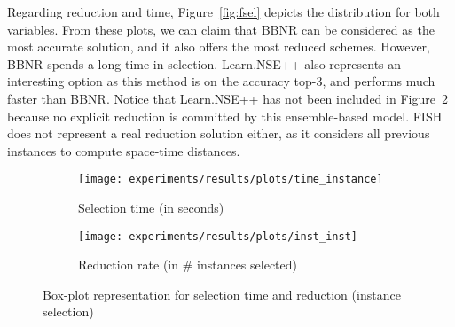 \documentclass[preprint,12pt]{elsarticle}
\begin{document}
\begin{table}[!htp]
\renewcommand{\arraystretch}{1.3}
\centering
\scriptsize
\caption{Wilcoxon test results and average rankings of methods (Friedman Procedure \& Adjusted p-value with Holm's Test) for accuracy}
\label{tab:wilcoxon-isel}
\end{table}

Regarding reduction and time, Figure~\ref{fig:fsel} depicts the distribution for both variables. From these plots, we can claim that BBNR can be considered as the most accurate solution, and it also offers the most reduced schemes. However, BBNR spends a long time in selection. Learn.NSE++ also represents an interesting option as this method is on the accuracy top-3, and performs much faster than BBNR. Notice that Learn.NSE++ has not been included in Figure~\ref{fig:inst-isel} because no explicit reduction is committed by this ensemble-based model. FISH does not represent a real reduction solution either, as it considers all previous instances to compute space-time distances.

\begin{figure}
\begin{subfigure}{.5\textwidth}
  \centering
  \texttt{[image: experiments/results/plots/time\_instance]}
  \caption{Selection time (in seconds)}
  \label{fig:time-isel}
\end{subfigure}%
\begin{subfigure}{.5\textwidth}
  \centering
  \texttt{[image: experiments/results/plots/inst\_inst]}
  \caption{Reduction rate (in \# instances selected)}
  \label{fig:inst-isel}
\end{subfigure}
\caption{Box-plot representation for selection time and reduction (instance selection)}
\label{fig:isel}
\end{figure}
\end{document}
